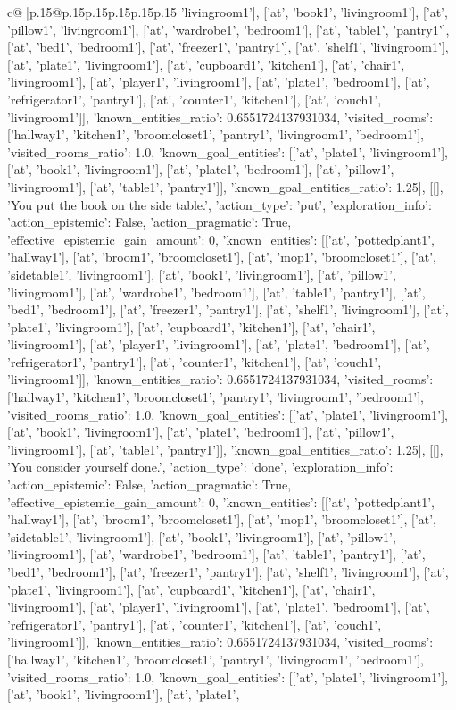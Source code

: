 \documentclass{article}
\begin{document}
{\begin{supertabular}{c@{$\;$}|p{.15\linewidth}@{}p{.15\linewidth}p{.15\linewidth}p{.15\linewidth}p{.15\linewidth}p{.15\linewidth}}
{{{'livingroom1'], ['at', 'book1', 'livingroom1'], ['at', 'pillow1', 'livingroom1'], ['at', 'wardrobe1', 'bedroom1'], ['at', 'table1', 'pantry1'], ['at', 'bed1', 'bedroom1'], ['at', 'freezer1', 'pantry1'], ['at', 'shelf1', 'livingroom1'], ['at', 'plate1', 'livingroom1'], ['at', 'cupboard1', 'kitchen1'], ['at', 'chair1', 'livingroom1'], ['at', 'player1', 'livingroom1'], ['at', 'plate1', 'bedroom1'], ['at', 'refrigerator1', 'pantry1'], ['at', 'counter1', 'kitchen1'], ['at', 'couch1', 'livingroom1']], 'known_entities_ratio': 0.6551724137931034, 'visited_rooms': ['hallway1', 'kitchen1', 'broomcloset1', 'pantry1', 'livingroom1', 'bedroom1'], 'visited_rooms_ratio': 1.0, 'known_goal_entities': [['at', 'plate1', 'livingroom1'], ['at', 'book1', 'livingroom1'], ['at', 'plate1', 'bedroom1'], ['at', 'pillow1', 'livingroom1'], ['at', 'table1', 'pantry1']], 'known_goal_entities_ratio': 1.25}}], [[], 'You put the book on the side table.', {'action_type': 'put', 'exploration_info': {'action_epistemic': False, 'action_pragmatic': True, 'effective_epistemic_gain_amount': 0, 'known_entities': [['at', 'pottedplant1', 'hallway1'], ['at', 'broom1', 'broomcloset1'], ['at', 'mop1', 'broomcloset1'], ['at', 'sidetable1', 'livingroom1'], ['at', 'book1', 'livingroom1'], ['at', 'pillow1', 'livingroom1'], ['at', 'wardrobe1', 'bedroom1'], ['at', 'table1', 'pantry1'], ['at', 'bed1', 'bedroom1'], ['at', 'freezer1', 'pantry1'], ['at', 'shelf1', 'livingroom1'], ['at', 'plate1', 'livingroom1'], ['at', 'cupboard1', 'kitchen1'], ['at', 'chair1', 'livingroom1'], ['at', 'player1', 'livingroom1'], ['at', 'plate1', 'bedroom1'], ['at', 'refrigerator1', 'pantry1'], ['at', 'counter1', 'kitchen1'], ['at', 'couch1', 'livingroom1']], 'known_entities_ratio': 0.6551724137931034, 'visited_rooms': ['hallway1', 'kitchen1', 'broomcloset1', 'pantry1', 'livingroom1', 'bedroom1'], 'visited_rooms_ratio': 1.0, 'known_goal_entities': [['at', 'plate1', 'livingroom1'], ['at', 'book1', 'livingroom1'], ['at', 'plate1', 'bedroom1'], ['at', 'pillow1', 'livingroom1'], ['at', 'table1', 'pantry1']], 'known_goal_entities_ratio': 1.25}}], [[], 'You consider yourself done.', {'action_type': 'done', 'exploration_info': {'action_epistemic': False, 'action_pragmatic': True, 'effective_epistemic_gain_amount': 0, 'known_entities': [['at', 'pottedplant1', 'hallway1'], ['at', 'broom1', 'broomcloset1'], ['at', 'mop1', 'broomcloset1'], ['at', 'sidetable1', 'livingroom1'], ['at', 'book1', 'livingroom1'], ['at', 'pillow1', 'livingroom1'], ['at', 'wardrobe1', 'bedroom1'], ['at', 'table1', 'pantry1'], ['at', 'bed1', 'bedroom1'], ['at', 'freezer1', 'pantry1'], ['at', 'shelf1', 'livingroom1'], ['at', 'plate1', 'livingroom1'], ['at', 'cupboard1', 'kitchen1'], ['at', 'chair1', 'livingroom1'], ['at', 'player1', 'livingroom1'], ['at', 'plate1', 'bedroom1'], ['at', 'refrigerator1', 'pantry1'], ['at', 'counter1', 'kitchen1'], ['at', 'couch1', 'livingroom1']], 'known_entities_ratio': 0.6551724137931034, 'visited_rooms': ['hallway1', 'kitchen1', 'broomcloset1', 'pantry1', 'livingroom1', 'bedroom1'], 'visited_rooms_ratio': 1.0, 'known_goal_entities': [['at', 'plate1', 'livingroom1'], ['at', 'book1', 'livingroom1'], ['at', 'plate1', }}}
\end{supertabular}}
\end{document}
